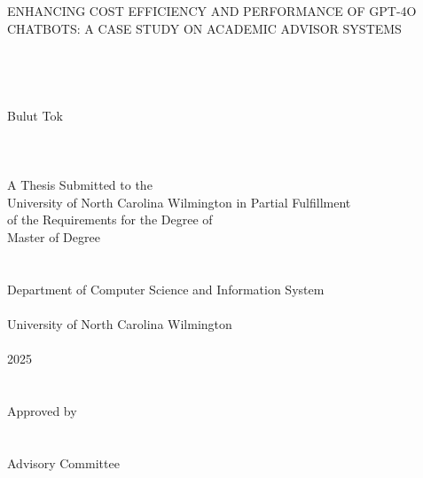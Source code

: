 \documentclass[12pt,oneside,openany]{report}
\begin{document}
\thispagestyle{empty}     %

\clearpage
\begin{singlespace}
\begin{center}
     \hskip 1pt \\
     \hskip 1pt \\    %
     ENHANCING COST EFFICIENCY AND PERFORMANCE OF GPT-4O CHATBOTS: A CASE STUDY ON ACADEMIC ADVISOR SYSTEMS\\
     \hskip 1pt \\
     \hskip 1pt \\
     \hskip 1pt \\
     \hskip 1pt \\    %
     Bulut Tok\\
     \hskip 1pt \\
     \hskip 1pt \\
     \hskip 1pt \\    %
    A Thesis Submitted to the\\
    University of North Carolina Wilmington in Partial Fulfillment\\
    of the Requirements for the Degree of\\
    Master of Degree\\
    \hskip 1pt \\
    \hskip 1pt \\    %
    Department of Computer Science and Information System\\
    \hskip 1pt \\    %
    University of North Carolina Wilmington\\
    \hskip 1pt \\    %
    2025\\
    \hskip 1pt \\
    \hskip 1pt \\    %
    Approved by\\
    \hskip 1pt \\
    \hskip 1pt \\    %
    Advisory Committee\\
    \hskip 1pt \\
    \hskip 1pt \\    %
\end{center}


\end{singlespace}
\end{document}
